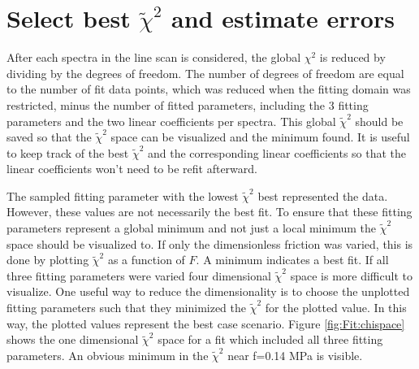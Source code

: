 \section*{Select best $\tilde{\chi}^2$ and estimate errors}
After each spectra in the line scan is considered, the global $\chi^2$ is reduced by dividing by the degrees of freedom.
The number of degrees of freedom are equal to the number of fit data points, which was reduced when the fitting domain was restricted, minus the number of fitted parameters, including the 3 fitting parameters and the two linear coefficients per spectra.
This global $\tilde{\chi}^2$ should be saved so that the $\tilde{\chi}^2$ space can be visualized and the minimum found.
It is useful to keep track of the best $\tilde{\chi}^2$ and the corresponding linear coefficients so that the linear coefficients won't need to be refit afterward.

The sampled fitting parameter with the lowest $\tilde{\chi}^2$ best represented the data.
However, these values are not necessarily the best fit.
To ensure that these fitting parameters represent a global minimum and not just a local minimum the $\tilde{\chi}^2$ space should be visualized to.
If only the dimensionless friction was varied, this is done by plotting $\tilde{\chi}^2$ as a function of $F$.
A minimum indicates a best fit.
If all three fitting parameters were varied four dimensional $\tilde{\chi}^2$ space is more difficult to visualize.
One useful way to reduce the dimensionality is to choose the unplotted fitting parameters such that they minimized the $\tilde{\chi}^2$ for the plotted value.
In this way, the plotted values represent the best case scenario.
Figure \ref{fig:Fit:chispace} shows the one dimensional $\tilde{\chi}^2$ space for a fit which included all three fitting parameters.
An obvious minimum in the $\tilde{\chi}^2$ near f=0.14 MPa is visible.

